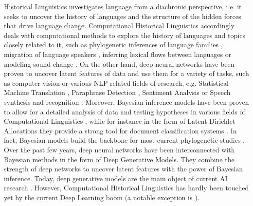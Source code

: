 \documentclass[6pt]{article}
\begin{document}
Historical Linguistics investigates language from a diachronic perspective, i.e. it seeks to uncover the history of languages and the structure of the hidden forces that drive language change.  Computational Historical Linguistics accordingly deals with computational methods to explore the history of languages and topics closely related to it, such as phylogenetic inferences of language families \citep{bouckaert2012mapping}, migration of language speakers \citep{gray2009language}, inferring lexical flows between languages \citep{dellert2015uralic} or modeling sound change \citep{bouchard2013automated}.  
On the other hand, deep neural networks have been proven to uncover latent features of data and use them for a variety of tasks, such as computer vision or various NLP-related fields of research, e.g. Statistical Machine Translation \citep{zhang2014bilingually,lauly2014autoencoder}, Paraphrase Detection \citep{socher2011dynamic}, Sentiment Analysis \citep{socher2013recursive} or Speech synthesis  and recognition \citep{hinton2012deep,zen2014deep}. 
Moreover, Bayesian inference models have been proven to allow for a detailed analysis of data and testing hypotheses in various fields of Computational Linguistics \citep{crocker2010computational,chater2006probabilistic}, while for instance in the form of Latent Dirichlet Allocations they provide a strong tool for document classification systems \citep{blei2003latent}. In fact, Bayesian models build the backbone for most current phylogenetic studies \citep{gray2009language,bouckaert2012mapping,bouchard2013automated}.
Over the past few years, deep neural networks have been interconnected with Bayesian methods in the form of Deep Generative Models. They combine the strength of deep networks to uncover latent features with the power of Bayesian inference. Today, deep generative models are the main object of current AI research \citep[p. 654]{Goodfellow-et-al-2016-Book}. 
 However, Computational Historical Linguistics has hardly been touched yet by the current Deep Learning boom (a notable exception is \cite{rama2016siamese}). 
\end{document}
